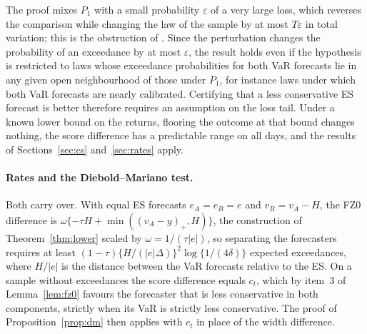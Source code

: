 The proof mixes $P_1$ with a small probability $\varepsilon$ of a very
large loss, which reverses the comparison while changing the law of the
sample by at most $T\varepsilon$ in total variation; this is the
obstruction of \citet{bahadur1956nonexistence}. Since the perturbation
changes the probability of an exceedance by at most $\varepsilon$, the
result holds even if the hypothesis is restricted to laws whose exceedance
probabilities for both VaR forecasts lie in any given open neighbourhood of
those under $P_1$, for instance laws under which both VaR forecasts are
nearly calibrated.
Certifying that a less conservative ES forecast is better therefore
requires an assumption on the loss tail. Under a known lower bound on the
returns, flooring the outcome at that bound changes nothing, the score
difference has a predictable range on all days, and the results of
Sections~\ref{sec:cs} and~\ref{sec:rates} apply.

\paragraph{Rates and the Diebold--Mariano test.}
Both carry over. With equal ES forecasts $e_A=e_B=e$ and $v_B=v_A-H$, the
FZ0 difference is $\omega\{-\tau H+\min((v_A-y)_+,H)\}$, the construction of
Theorem~\ref{thm:lower} scaled by $\omega=1/(\tau|e|)$, so separating the forecasters
requires at least $(1-\tau)\{H/(|e|\Delta)\}^2\log\{1/(4\delta)\}$
expected exceedances, where $H/|e|$ is the distance between the VaR
forecasts relative to the ES. On a sample without exceedances the score
difference equals $c_t$, which by item~3 of Lemma~\ref{lem:fz0} favours
the forecaster that is less conservative in both components, strictly when
its VaR is strictly less conservative. The proof of
Proposition~\ref{prop:dm} then applies with $c_t$ in place of the width
difference.
